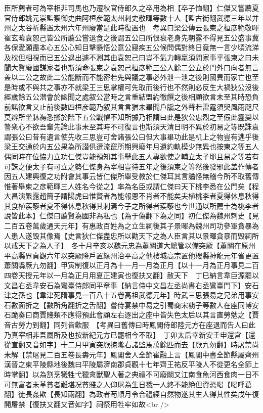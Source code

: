 臣所薦者可為宰相非司馬也乃遷秋官侍郎久之卒用為相【卒子恤翻】仁傑又嘗薦夏官侍郎姚元崇監察御史曲阿桓彦範太州刺史敬暉等數十人【監古衘翻武德三年以并州之太谷祈縣置太州六年州廢當是此時復置也　考異曰梁公傳云張柬之桓彦範敬暉崔玄暐袁恕己皆公所薦公嘗退食之後謂五公曰所恨衰老身先朝露不得見五公盛事冀各保愛願盡本心五公心知目擊懸悟公意公寢疾五公候問偶對終日竟無一言少頃流涕及枕但相視而已五公退出遽不測其由袁恕己曰豈不氣力轉羸須問家事乎張柬之曰未聞大賢廢國謀家者也斯須命張柬之袁恕己桓彦範三公入餘二公立於門外曰向者無言盖以二公之故此二公能斷而不能密若先與議之事必外泄一泄之後則國異而家亡也至是時或不與共之事亦不就梁王三思掌權可先取而後行也不然則必反生大禍狄公沒後經歲餘五公潜會於幽聞之處叙公當時之言重結盟約徹饌之後相顧欲言未至其時恐負前諾欲言又止前後數四桓彦範乃叙其言言猶未畢聞戶牖之外聲若雷霆須臾風雨咫尺莫辨所坐牀褥悉擲於階下五公戰懼不知所據乃相謂曰此是狄公忠烈之至假此靈變以警衆心不欲吾輩先論此事未至其時不可復言也斯須天清日明不異於初易之等既誅袁謂張公曰昔有遺言使先收三思豈可舍諸張公曰但大事畢功此是机上之物豈有逃乎後梁王交通於内五公果為所譛俱遭流竄所期興廢年月遺約軌模少無異也按東之等五人偶同時在位恊力立功仁傑豈能預知其事舉此五人專欲使之輔立太子耶且易之等若有可誅之便太子有可立之勢仁傑身為宰相豈待五年之後須柬之等然後發邪此盖作傳者因五人建興復之功附會其事云皆仁傑所舉受教於仁傑耳其言譎怪無稽今所不取舊傳惟著舉柬之彦範暉三人姓名今從之】率為名臣或謂仁傑曰天下桃李悉在公門矣【程大昌演繁露趙簡子謂陽虎曰惟賢者為能報恩不肖者不能矣夫植桃李者夏得休息秋得其食植蒺藜者夏不得休息秋得其刺焉今子之所得者蒺藜也今世通以所薦士為桃李者說皆此本】仁傑曰薦賢為國非為私也【為于偽翻下為之同】初仁傑為魏州刺史【見二百五卷萬歲通天元年】有惠政百姓為之立生祠後其子景暉為魏州司功參軍貪暴為人患人遂毁其像焉【史言狄仁傑盡忠所以勸天下之為人臣言其以景暉貪暴而毁祠所以戒天下之為人子】　冬十月辛亥以魏元忠為蕭關道大總管以備突厥【蕭關在原州平高縣界貞觀六年以突厥降戶置緣州治平高之他樓城高宗置他樓縣神龍元年省更置蕭關縣厥九勿翻】甲寅制復以正月為十一月一月為正月【以十一月為正月事見二百四卷天授元年以一月為正月用夏正建寅也復扶又翻】赦天下　丁巳納言韋巨源罷以文昌右丞韋安石為鸞臺侍郎同平章事【納言侍中文昌左丞尚書右丞鸞臺門下】安石津之孫也【韋津死隋事見一百八十五卷高祖武德元年】時武三思張易之兄弟用事安石數面折之【數所角翻折之舌翻】嘗侍宴禁中易之引蜀商宋覇子等數人在座同博安石跪奏曰商賈賤類不應得預此會顧左右逐出之座中皆失色太后以其言直勞勉之【賈音古勞力到翻】同列皆歡服　【考異曰舊傳曰時鳳閣侍郎陸元方在座退而告人曰此乃真宰相非吾屬所及也按新紀元方已罷相今不取】　丁卯太后幸新安壬申還宫【還從宣翻又音如字】十二月甲寅突厥掠隴右諸監馬萬餘匹而去【厥九勿翻】時屠禁尚未解【禁屠見二百五卷長夀元年】鳳閣舍人全節崔融上言【鳳閣中書全節縣屬齊州漢晉之東平陵縣地後魏曰平陵屬濟南郡貞觀十七年齊王祐反平陵人不從更名全節上時掌翻】以為割烹犧牲弋獵禽獸聖人著之典禮不可廢闕又江南食魚河西食肉一日不可無富者未革貧者難堪况貧賤之人仰屠為生日戮一人終不能絶但資恐喝【喝呼葛翻】徒長姦欺【長知兩翻】為政者苟順月令合禮經自然物遂其生人得其性矣戊午復開屠禁【復扶又翻又音如字】祠祭用牲牢如故<br />
